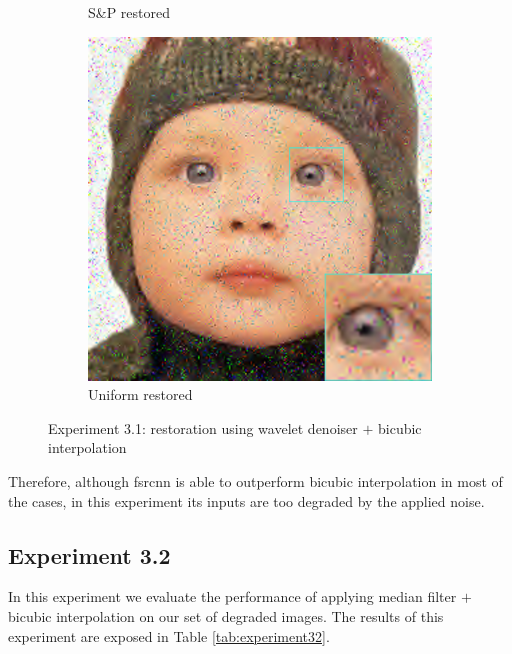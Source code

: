 \begin{figure}
\begin{subfigure}{0.24\textwidth}
		\caption{S\&P restored}
	\end{subfigure}
	\begin{subfigure}{0.24\textwidth}
		\includegraphics[width=\textwidth]{images/exp3.1/uniform.png}
		\caption{Uniform restored}
	\end{subfigure}
	\caption{Experiment 3.1: restoration using wavelet denoiser $+$ bicubic interpolation}
	\label{fig:exp3.1}
\end{figure}

Therefore, although \gls{fsrcnn} is able to outperform bicubic interpolation in most of the cases, in this experiment its inputs are too degraded by the applied noise.

\subsection{Experiment 3.2}
In this experiment we evaluate the performance of applying median filter $+$ bicubic interpolation on our set of degraded images. The results of this experiment are exposed in Table \ref{tab:experiment32}.

